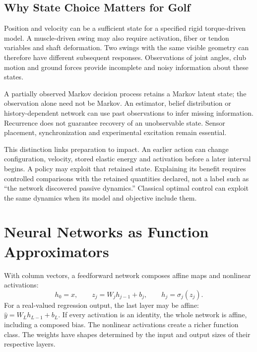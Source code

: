 \subsection{Why State Choice Matters for Golf}

Position and velocity can be a sufficient state for a specified rigid torque-driven model. A muscle-driven swing may also require activation, fiber or tendon variables and shaft deformation. Two swings with the same visible geometry can therefore have different subsequent responses. Observations of joint angles, club motion and ground forces provide incomplete and noisy information about these states.

A partially observed Markov decision process retains a Markov latent state; the observation alone need not be Markov. An estimator, belief distribution or history-dependent network can use past observations to infer missing information. Recurrence does not guarantee recovery of an unobservable state. Sensor placement, synchronization and experimental excitation remain essential.

This distinction links preparation to impact. An earlier action can change configuration, velocity, stored elastic energy and activation before a later interval begins. A policy may exploit that retained state. Explaining its benefit requires controlled comparisons with the retained quantities declared, not a label such as ``the network discovered passive dynamics.'' Classical optimal control can exploit the same dynamics when its model and objective include them.

\section{Neural Networks as Function Approximators}

With column vectors, a feedforward network composes affine maps and nonlinear activations:
\begin{equation}
h_0=x,\qquad z_j=W_jh_{j-1}+b_j,\qquad h_j=\sigma_j(z_j).
\end{equation}
For a real-valued regression output, the last layer may be affine: $\hat y=W_Lh_{L-1}+b_L$. If every activation is an identity, the whole network is affine, including a composed bias. The nonlinear activations create a richer function class. The weights have shapes determined by the input and output sizes of their respective layers.

